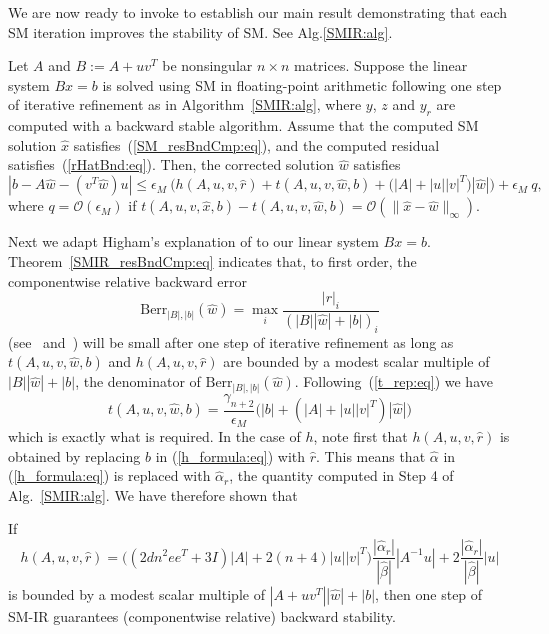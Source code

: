 \documentclass{siamltex}
\newcommand{\eqnref}[1]{(\ref{#1})}
\newcommand{\eps}{\epsilon}
\begin{document}
We are now ready to invoke \cite[Thm. 12.3]{Higham02} to establish our main result demonstrating that each SM iteration improves the stability of SM. See Alg.\ref{SMIR:alg}. 
\begin{theorem}
Let $A$ and $B := A + u v^T$ be nonsingular $n \times n$ matrices. Suppose the linear system $B x = b$ is solved using SM in floating-point arithmetic following one step of iterative refinement as in Algorithm~\ref{SMIR:alg}, where $y$, $z$ and $y_r$ are computed with a backward stable algorithm. Assume that the computed SM solution $\hat x$ satisfies~\eqnref{SM_resBndCmp:eq}, and the computed residual satisfies~\eqnref{rHatBnd:eq}. Then, the corrected solution $\hat w$ satisfies
\begin{equation} \label{SMIR_resBndCmp:eq}
|b - A\hat w - (v^T \hat w) u| \leq \eps_M \ \Big( h(A,u,v, \hat r) + t(A,u,v, \hat w, b)+ \big( |A|+|u||v|^T \big) |\hat w|\Big) + \eps_M \ q,
\end{equation}
where $q = \mathcal{O}(\eps_M)$ if $t(A,u,v,\hat x, b) - t(A,u,v,\hat w, b) = \mathcal{O}(\|\hat x - \hat w\|_{\infty})$.
\end{theorem}

Next we adapt Higham's explanation of \cite[Thm. 12.3]{Higham02} to our linear system $Bx=b$. Theorem~\ref{SMIR_resBndCmp:eq} indicates that, to first order, the componentwise relative backward error 
\[
\mbox{Berr}_{|B|,|b|}(\hat w) = \max_{i} \frac{|r|_i}{(|B| |\hat w| + |b|)_i}
\]
(see~\cite{Oettli64} and~\cite[Thm. 7.3]{Higham02})
will be small after one step of iterative refinement as long as $t(A,u,v,\hat w, b)$ and $h(A,u,v,\hat r)$ are bounded by a modest scalar multiple of $|B| |\hat w| + |b|$, the denominator of $\mbox{Berr}_{|B|,|b|}(\hat w)$. Following~\eqnref{t_rep:eq} we have
\[
t(A,u,v,\hat w, b) = \frac{\gamma_{n+2}}{\eps_M} \Big(  |b| + (|A|  + |u| |v|^T)|\hat w| \Big)
\] 
which is exactly what is required. In the case of $h$, note first that $h(A,u,v,\hat r)$ is obtained by replacing $b$ in \eqnref{h_formula:eq} with $\hat r$. This means that $\hat \alpha$ in \eqnref{h_formula:eq} is replaced with $\hat \alpha_r$, the quantity computed in Step 4 of Alg.~\ref{SMIR:alg}. We have therefore shown that

\begin{theorem} \label{oneIRenough:thm}
If 
\begin{equation} \label{h_r_formula:eq}
h(A,u,v, \hat r) = \Big( (2d n^2 e e^T + 3I) |A| + 2 (n+4) |u| |v|^T\Big) \frac{|\hat \alpha_r|}{|\hat \beta|}  |A^{-1} u| + 2 \frac{|\hat \alpha_r|}{|\hat \beta|} |u|
\end{equation}
is bounded by a modest scalar multiple of $|A+uv^T| |\hat w| + |b|$, then one step of SM-IR guarantees (componentwise relative) backward stability.
\end{theorem}
\end{document}
